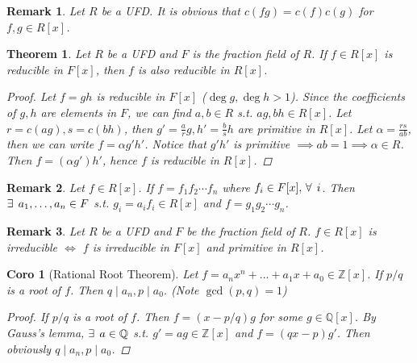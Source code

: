 \documentclass[a4paper]{article}
\let\existstemp\exists
\let\foralltemp\forall
\renewcommand*{\exists}{\existstemp\mkern4mu}
\renewcommand*{\forall}{\foralltemp\mkern4mu}
\newcommand{\Zb}{\mathbb{Z}}
\newcommand{\Qb}{\mathbb{Q}}
\theoremstyle{mystyle}
\newtheorem{theorem}{Theorem}
\newtheorem{remark}{Remark}
\newtheorem{coro}{Coro}
\begin{document}
\begin{remark}
  Let $R$ be a UFD. It is obvious that $c(fg) = c(f)c(g)$ for $f, g \in R[x]$.
\end{remark}

\begin{theorem}
  Let $R$ be a UFD and $F$ is the fraction field of $R$. If $f \in R[x]$
  is reducible in $F[x]$, then $f$ is also reducible in $R[x]$.

  \begin{proof}
    Let $f = gh$ is reducible in $F[x]$ ($\deg g, \deg h > 1$).
    Since the coefficients of $g, h$ are elements in $F$, we can find
    $a, b \in R$ s.t. $ag, bh \in R[x]$. Let $r = c(ag), s = c(bh)$, then
    $g' = \frac{a}{r}g, h' = \frac{b}{s}h$ are primitive in $R[x]$.
    Let $\alpha = \frac{rs}{ab}$, then we can write $f = \alpha g' h'$.
    Notice that $g'h'$ is primitive $\implies ab = 1 \implies \alpha \in R$.
    Then $f = (\alpha g')  h'$, hence $f$ is reducible in $R[x]$.
  \end{proof}
\end{theorem}

\begin{remark}
  Let $f \in R[x]$. If $f = f_1 f_2 \dotsm f_n$ where $f_i \in F[x],\, \forall i$.
  Then $\exists a_1, \dots, a_n \in F$ s.t. $g_i = a_if_i \in R[x]$ and
  $f = g_1 g_2 \dotsm g_n$.
\end{remark}

\begin{remark}
  Let $R$ be a UFD and $F$ be the fraction field of $R$. $f \in R[x]$
  is irreducible $\iff$ $f$ is irreducible in $F[x]$ and primitive in $R[x]$.
\end{remark}

\begin{coro}[Rational Root Theorem]
  Let $f = a_n x^n + \dots + a_1 x + a_0 \in \Zb[x]$.
  If $p/q$ is a root of $f$. Then $q \mid a_n, p \mid a_0$.
  (Note $\gcd(p, q) = 1$)
  \begin{proof}
    If $p/q$ is a root of $f$. Then $f = (x - p/q)g$ for some $g \in \Qb[x]$.
    By Gauss's lemma, $\exists a \in \Qb$ s.t. $g' = ag \in \Zb[x]$ and
    $f = (qx - p)g'$. Then obviously $q \mid a_n, p \mid a_0$.
  \end{proof}
\end{coro}
\end{document}
